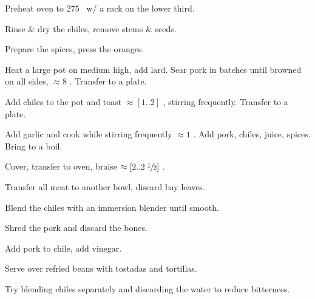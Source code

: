 \begin{preparation}
\item Preheat oven to 275 \Fahrenheit\ w/ a rack on the lower third.
\item Rinse \& dry the chiles, remove stems \& seeds.
\item Prepare the spices, press the oranges.
\item Heat a large pot on medium high, add lard.
    Sear pork in batches until browned on all sides, $\approx8$ \minute.
    Transfer to a plate.
\item Add chiles to the pot and toast $\approx[1..2]$ \minute, stirring frequently.
    Transfer to a plate.
\item Add garlic and cook while stirring frequently $\approx1$ \minute.
    Add pork, chiles, juice, spices.
    Bring to a boil.
\item Cover, transfer to oven, braise $\approx[2..2\;\sfrac{1}{2}]$ \hour.
\item Transfer all meat to another bowl, discard bay leaves.
\item Blend the chiles with an immersion blender until smooth.
\item Shred the pork and discard the bones.
\item Add pork to chile, add vinegar.
\item Serve over refried beans with tostadas and tortillas.
\end{preparation}

\begin{experiments}
\item Try blending chiles separately and discarding the water to reduce bitterness.
\end{experiments}
\recipeend%
